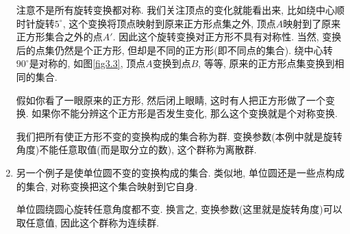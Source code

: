 \begin{enumerate}
	注意不是所有旋转变换都对称. 我们关注顶点的变化就能看出来, 比如绕中心顺时针旋转$5^\circ$, 这个变换将顶点映射到原来正方形点集之外, 顶点$A$映射到了原来正方形集合之外的点$A'$. 因此这个旋转变换对正方形不具有对称性. 当然, 变换后的点集仍然是个正方形, 但却是不同的正方形(即不同点的集合). 绕中心转$90^\circ$是对称的, 如图\ref{fig3.3}, 顶点$A$变换到点$B$, 等等, 原来的正方形点集变换到相同的集合.
	
	{
	}
	
	假如你看了一眼原来的正方形, 然后闭上眼睛, 这时有人把正方形做了一个变换. 如果你不能分辨这个正方形是否发生变化, 那么这个变换就是个对称变换.
	
	我们把所有使正方形不变的变换构成的集合称为群. 变换参数(本例中就是旋转角度)不能任意取值(而是取分立的数), 这个群称为离散群.
	
	\item 另一个例子是使单位圆不变的变换构成的集合. 类似地, 单位圆还是一些点构成的集合, 对称变换把这个集合映射到它自身.
	
	单位圆绕圆心旋转任意角度都不变. 换言之, 变换参数(这里就是旋转角度)可以取任意值, 因此这个群称为连续群.
\end{enumerate}


